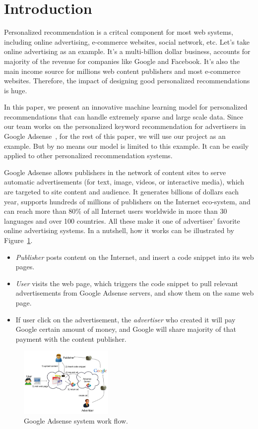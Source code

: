 \section{Introduction}
\label{sec:intro}

Personalized recommendation is a critcal component for most web
systems, including online advertising, e-commerce websites, social
network, etc. Let's take online advertising as an example. It's a
multi-billion dollar business, accounts for majority of the revenue
for companies like Google and Facebook. It's also the main income
source for millions web content publishers and most e-commerce
websites. Therefore, the impact of designing good personalized
recommendations is huge.

In this paper, we present an innovative machine learning model for
personalized recommendations that can handle extremely sparse and
large scale data. Since our team works on the personalized keyword
recommendation for advertisers in Google Adsense~\cite{adsense:wiki},
for the rest of this paper, we will use our project as an example. But
by no means our model is limited to this example. It can be easily
applied to other personalized recommendation systems.

Google Adsense allows publishers in the network of content sites to
serve automatic advertisements (for text, image, videos, or
interactive media), which are targeted to site content and
audience. It generates billions of dollars each year, supports
hundreds of millions of publishers on the Internet eco-system, and can
reach more than 80\% of all Internet users worldwide in more than 30
languages and over 100 countries. All these make it one of advertiser'
favorite online advertising systems. In a nutshell, how it works can
be illustrated by Figure~\ref{fig:adsense}.
\begin{itemize} \itemsep -1pt
\item {\em Publisher} posts content on the Internet, and insert a code
  snippet into its web pages.
\item {\em User} visits the web page, which triggers the code snippet
  to pull relevant advertisements from Google Adsense servers, and
  show them on the same web page.
\item If user click on the advertisement, the {\em advertiser} who
  created it will pay Google certain amount of money, and Google will
  share majority of that payment with the content publisher.
\end{itemize}

\begin{figure}[!ht]
  \centering
  \includegraphics[width=0.4\textwidth]{figures/adsense.jpg}
  \caption{Google Adsense system work flow.}
  \label{fig:adsense}
\end{figure}

